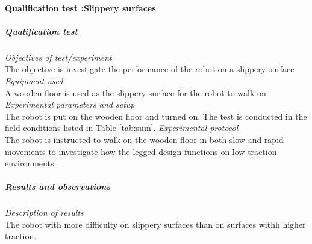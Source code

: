 \paragraph{Qualification test  :Slippery surfaces}
\subparagraph{Qualification test}
\textit{Objectives of test/experiment}\\
The objective is investigate the performance of the robot on a slippery surface
\textit{Equipment used}\\
A wooden floor is used as the slippery surface for the robot to walk on.
\textit{Experimental parameters and setup }\\
The robot is put on the wooden floor and turned on. The test is conducted in the field conditions listed in Table \ref{tab:sum}.
\textit{Experimental protocol}\\
The robot is instructed to walk on the wooden floor in both slow and rapid movements to investigate how the legged design functions on low traction environments.
\subparagraph{Results and observations}
\textit{Description of results}\\
The robot with more difficulty on slippery surfaces than on surfaces withh higher traction.





